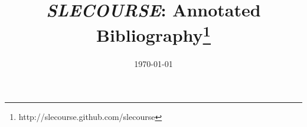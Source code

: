 \documentclass[12pt]{article}
\begin{document}
\title{\emph{SLECOURSE}: Annotated Bibliography\thanks{http://slecourse.github.com/slecourse}}

\date{\today}

\maketitle

\nocite{*}



\end{document}
